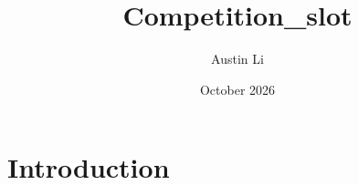 \documentclass{article}
\title{Competition_slot}
\author{Austin Li}
\date{October 2026}
\begin{document}
\maketitle

\section{Introduction}
\end{document}
